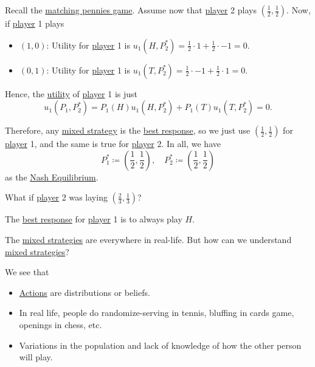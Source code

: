 \begin{prev}
	Recall the \hyperref[eg:matching-pennies]{matching pennies game}. Assume now that \hyperref[def:player]{player} 2 plays \((\frac{1}{2}, \frac{1}{2})\).
	Now, if \hyperref[def:player]{player} 1 plays
	\begin{itemize}
		\item \((1, 0)\): Utility for \hyperref[def:player]{player} 1 is \(u_1(H, P^{\ast}_2) = \frac{1}{2}\cdot 1 + \frac{1}{2}\cdot -1 = 0\).
		\item \((0, 1)\): Utility for \hyperref[def:player]{player} 1 is \(u_1(T, P^{\ast}_2) = \frac{1}{2}\cdot -1 + \frac{1}{2}\cdot 1 = 0\).
	\end{itemize}
	Hence, the \hyperref[def:reward]{utility} of \hyperref[def:player]{player} 1 is just
	\[
		u_1(P_1, P^{\ast}_2) = P_1(H)u_1(H, P^{\ast}_2)+P_1(T)u_1(T, P^{\ast}_2) = 0.
	\]

	Therefore, any \hyperref[def:mixed-strategy]{mixed strategy} is the \hyperref[def:best-response]{best response}, so we just use
	\((\frac{1}{2}, \frac{1}{2})\) for \hyperref[def:player]{player} 1, and the same is true for \hyperref[def:player]{player} 2. In all, we have
	\[
		P_1^{\ast}\coloneqq \left(\frac{1}{2}, \frac{1}{2}\right), \quad P_2^{\ast}\coloneqq \left(\frac{1}{2}, \frac{1}{2}\right)
	\]
	as the \hyperref[def:Nash-equilibrium]{Nash Equilibrium}.

	\begin{problem}
	What if \hyperref[def:player]{player} 2 was laying \(\left(\frac{2}{3}, \frac{1}{3}\right)\)?
	\end{problem}
	\begin{answer}
		The \hyperref[def:best-response]{best response} for \hyperref[def:player]{player} 1 is to always play \(H\).
	\end{answer}
\end{prev}

\begin{problem}
The \hyperref[def:mixed-strategy]{mixed strategies} are everywhere in real-life. But how can we understand \hyperref[def:mixed-strategy]{mixed strategies}?
\end{problem}
\begin{answer}
	We see that
	\begin{itemize}
		\item \hyperref[def:strategy]{Actions} are distributions or beliefs.
		\item In real life, people do randomize-serving in tennis, bluffing in cards game, openings in chess, etc.
		\item Variations in the population and lack of knowledge of how the other person will play.
	\end{itemize}
\end{answer}

